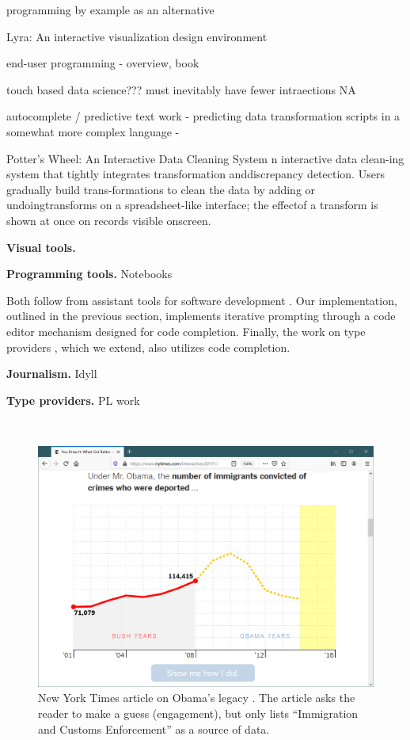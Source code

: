 \documentclass{sigchi}
\begin{document}
programming by example as an alternative
\cite{spreadsheetpbe,flashextract}

Lyra: An interactive visualization design environment
\cite{lyra}

end-user programming
\cite{enduser} - overview, \cite{smallmatter} book

touch based data science??? must inevitably have fewer intraections
NA

autocomplete / predictive text work
\cite{predictive} - predicting data transformation scripts in a somewhat more complex language
\cite{proactive} -

\cite{potter}
Potter’s Wheel: An Interactive Data Cleaning System
n interactive data clean-ing system that tightly integrates transformation anddiscrepancy detection.   Users  gradually build  trans-formations  to  clean  the  data  by  adding  or  undoingtransforms on a spreadsheet-like interface; the effectof a transform is shown at once on records visible onscreen.

\newpage

\textbf{Visual tools.}

\textbf{Programming tools.}
Notebooks

Both follow from assistant tools for software development \cite{assistants}. Our implementation,
outlined in the previous section, implements iterative prompting through a code editor mechanism
designed for code completion. Finally, the work on type providers \cite{inforich,fsdata,dotdriven},
which we extend, also utilizes code completion.


\textbf{Journalism.}
Idyll \cite{idyll}

\textbf{Type providers.}
PL work

\newpage
~
\newpage

\begin{figure}
\includegraphics[width=1\columnwidth]{figures/nyt}
\caption{New York Times article on Obama's legacy \cite{youdraw}. The article asks the reader to make a guess
(engagement), but only lists ``Immigration and Customs Enforcement'' as a source of data.}
\label{fig:nyt}
\end{figure}
\end{document}
